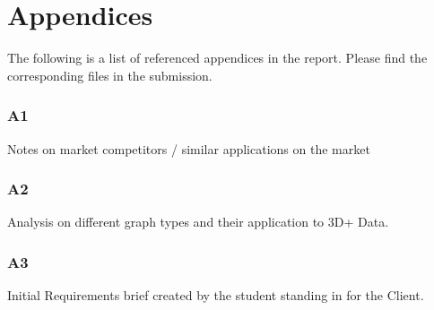 \section{Appendices}
The following is a list of referenced appendices in the report. Please find the corresponding files in the submission.

\subsubsection{A1} \label{A1}
Notes on market competitors / similar applications on the market

\subsubsection{A2} \label{A2}
Analysis on different graph types and their application to 3D+ Data.

\subsubsection{A3} \label{A3}
Initial Requirements brief created by the student standing in for the Client.